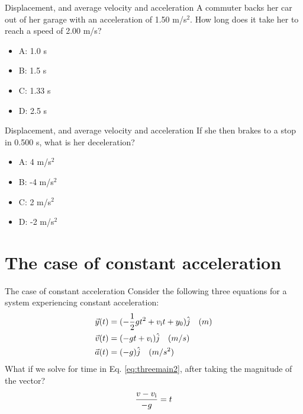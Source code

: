 \documentclass{beamer}
\begin{document}
\begin{frame}{Displacement, and average velocity and acceleration}
A commuter backs her car out of her garage with an acceleration of 1.50 m/s$^2$.  How long does it take her to
reach a speed of 2.00 m/s?
\begin{itemize}
\item A: 1.0 s
\item B: 1.5 s
\item C: 1.33 s
\item D: 2.5 s
\end{itemize}
\end{frame}

\begin{frame}{Displacement, and average velocity and acceleration}
If she then brakes to a stop in 0.500 s, what is her deceleration?
\begin{itemize}
\item A: 4 m/s$^2$
\item B: -4 m/s$^2$
\item C: 2 m/s$^2$
\item D: -2 m/s$^2$
\end{itemize}
\end{frame}

\section{The case of constant acceleration}

\begin{frame}{The case of constant acceleration}
Consider the following three equations for a system experiencing constant acceleration:
\begin{align}
\vec{y}(t) &= (-\frac{1}{2}gt^2+v_{\rm i}t+y_{\rm 0}) \hat{j} \quad (m) \label{eq:threemain1} \\
\vec{v}(t) &= (-gt + v_{\rm i}) \hat{j} \quad (m/s) \label{eq:threemain2} \\
\vec{a}(t) &= (-g) \hat{j} \quad (m/s^2) \label{eq:threemain3}
\end{align}
What if we solve for time in Eq. \ref{eq:threemain2}, after taking the magnitude of the vector? \\
\begin{equation}
\frac{v-v_{\rm i}}{-g} = t
\label{eq:subt1}
\end{equation}
\end{frame}
\end{document}

